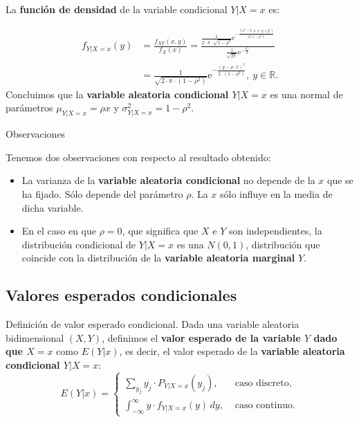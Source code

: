 \documentclass[
  letterpaper,
  DIV=11,
  numbers=noendperiod]{scrreprt}
\begin{document}
La \textbf{función de densidad} de la variable condicional \(Y|X=x\) es:

\[
\begin{array}{rl}
f_{Y|X=x}(y) & =  \frac{f_{XY}(x,y)}{f_X(x)}=\frac{\frac{1}{2\cdot \pi\cdot \sqrt{1-\rho^2}}\mathrm{e}^{-\frac{(x^2-2\cdot \rho \cdot x\cdot y+y^2)}{2(1-\rho^2)}}}{\frac{1}{\sqrt{2\pi}}\mathrm{e}^{-\frac{x^2}{2}}}\\
& =\frac{1}{\sqrt{2\cdot \pi\cdot  (1-\rho^2)}}\mathrm{e}^{-\frac{(y-\rho\cdot  x)^2}{2\cdot (1-\rho^2)}},\ y\in\mathbb{R}.
\end{array}
\] Concluimos que la \textbf{variable aleatoria condicional \(Y|X=x\)}
es una normal de parámetros \(\mu_{Y|X=x}=\rho x\) y
\(\sigma_{Y|X=x}^2 =1-\rho^2\).

Observaciones

Tenemos dos observaciones con respecto al resultado obtenido:

\begin{itemize}
\item
  La varianza de la \textbf{variable aleatoria condicional} no depende
  de la \(x\) que se ha fijado. Sólo depende del parámetro \(\rho\). La
  \(x\) sólo influye en la media de dicha variable.
\item
  En el caso en que \(\rho=0\), que significa que \(X\) e \(Y\) son
  independientes, la distribución condicional de \(Y|X=x\) es una
  \(N(0,1)\), distribución que coincide con la distribución de la
  \textbf{variable aleatoria marginal} \(Y\).
\end{itemize}

\hypertarget{valores-esperados-condicionales}{%
\subsection{Valores esperados
condicionales}\label{valores-esperados-condicionales}}

Definición de valor esperado condicional. Dada una variable aleatoria
bidimensional \((X,Y)\), definimos el \textbf{valor esperado de la
variable \(Y\) dado que \(X=x\)} como \(E(Y|x)\), es decir, el valor
esperado de la \textbf{variable aleatoria condicional \(Y|X=x\)}: \[
E(Y|x)=\begin{cases}
\displaystyle\sum_{y_j} y_j \cdot P_{Y|X=x}(y_j), & \mbox{ caso discreto,}\\
\displaystyle\int_{-\infty}^\infty y \cdot f_{Y|X=x}(y)\,dy, & \mbox{ caso continuo.}
\end{cases}
\]
\end{document}
